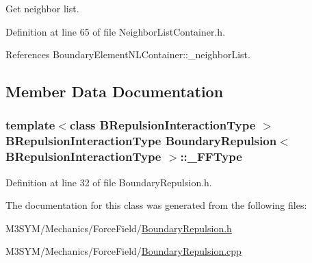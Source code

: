 Get neighbor list. 



Definition at line 65 of file Neighbor\+List\+Container.\+h.



References Boundary\+Element\+N\+L\+Container\+::\+\_\+neighbor\+List.



\subsection{Member Data Documentation}
\hypertarget{classBoundaryRepulsion_a155fc2c7cded4f928ebd0371276e8016}{
\subsubsection[{\+\_\+\+F\+F\+Type}]{\setlength{\rightskip}{0pt plus 5cm}template$<$class B\+Repulsion\+Interaction\+Type $>$ B\+Repulsion\+Interaction\+Type {\bf Boundary\+Repulsion}$<$ B\+Repulsion\+Interaction\+Type $>$\+::\+\_\+\+F\+F\+Type\hspace{0.3cm}{\ttfamily [private]}}}\label{classBoundaryRepulsion_a155fc2c7cded4f928ebd0371276e8016}


Definition at line 32 of file Boundary\+Repulsion.\+h.



The documentation for this class was generated from the following files\+:\begin{DoxyCompactItemize}
\item 
M3\+S\+Y\+M/\+Mechanics/\+Force\+Field/\hyperlink{BoundaryRepulsion_8h}{Boundary\+Repulsion.\+h}\item 
M3\+S\+Y\+M/\+Mechanics/\+Force\+Field/\hyperlink{BoundaryRepulsion_8cpp}{Boundary\+Repulsion.\+cpp}\end{DoxyCompactItemize}
